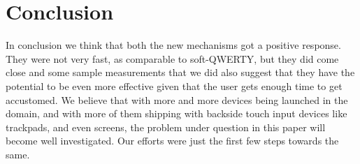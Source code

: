 \section{Conclusion}
In conclusion we think that both the new mechanisms got a positive response. They were not very fast, as comparable to soft-QWERTY, but they did come close and some sample measurements that we did also suggest that they have the potential to be even more effective given that the user gets enough time to get accustomed. We believe that with more and more devices being launched in the domain, and with more of them shipping with backside touch input devices like trackpads, and even screens, the problem under question in this paper will become well investigated. Our efforts were just the first few steps towards the same.